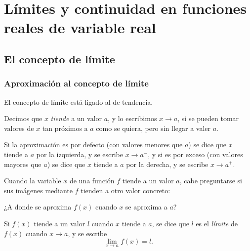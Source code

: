 \section{Límites y continuidad en funciones reales de variable real}



\subsection{El concepto de límite}
\begin{frame}
	\frametitle{Aproximación al concepto de límite}
	El concepto de límite está ligado al de tendencia.
	
	Decimos que $x$ \emph{tiende} a un valor $a$, y lo escribimos $x\rightarrow a$, si se pueden tomar valores de $x$ tan próximos a $a$ como se quiera, pero sin llegar a valer $a$.
	
	Si la aproximación es por defecto (con valores menores que $a$) se dice que $x$ tiende a $a$ por la izquierda, y se escribe $x\rightarrow a^-$, y si es por exceso (con valores mayores que $a$) se dice que $x$ tiende a $a$ por la derecha, y se escribe $x\rightarrow a^+$.
	
	Cuando la variable $x$ de una función $f$ tiende a un valor $a$, cabe preguntarse si sus imágenes mediante $f$ tienden a otro valor concreto:
	\begin{center}
		\alert{¿A donde se aproxima $f(x)$ cuando $x$ se aproxima a $a$?}
	\end{center}
	
	Si $f(x)$ tiende a un valor $l$ cuando $x$ tiende a $a$, se dice que $l$ es el \emph{límite} de $f(x)$ cuando $x\rightarrow a$, y se escribe
	\[\lim_{x\rightarrow a}f(x)=l.\]
\end{frame}



